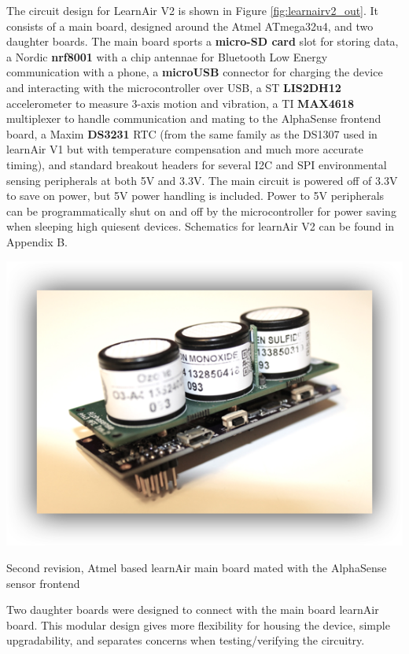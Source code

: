 The circuit design for LearnAir V2 is shown in Figure \ref{fig:learnairv2_out}.  It consists of a main board, designed around the Atmel ATmega32u4, and two daughter boards.  The main board sports a \textbf{micro-SD card} slot for storing data, a Nordic \textbf{nrf8001} with a chip antennae for Bluetooth Low Energy communication with a phone, a \textbf{microUSB} connector for charging the device and interacting with the microcontroller over USB, a ST \textbf{LIS2DH12} accelerometer to measure 3-axis motion and vibration, a TI \textbf{MAX4618} multiplexer to handle communication and mating to the AlphaSense frontend board, a Maxim \textbf{DS3231} RTC (from the same family as the DS1307 used in learnAir V1 but with temperature compensation and much more accurate timing), and standard breakout headers for several I2C and SPI environmental sensing peripherals at both 5V and 3.3V.  The main circuit is powered off of 3.3V to save on power, but 5V power handling is included.  Power to 5V peripherals can be programmatically shut on and off by the microcontroller for power saving when sleeping high quiesent devices.  Schematics for learnAir V2 can be found in Appendix B.

\begin{marginfigure}[3.5cm]
 	\includegraphics[width=\textwidth]{visuals/learnairV2}               
 	 \caption{Second revision, Atmel based learnAir main board mated with the AlphaSense sensor frontend}
  	\label{fig:learnairV2}
\end{marginfigure}

Two daughter boards were designed to connect with the main board learnAir board.  This modular design gives more flexibility for housing the device, simple upgradability, and separates concerns when testing/verifying the circuitry.  

